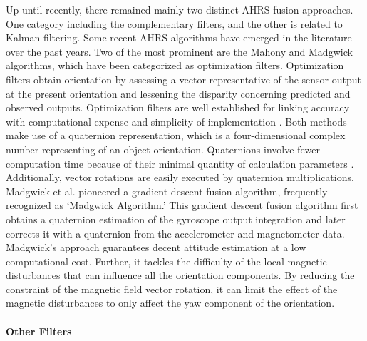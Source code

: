 Up until recently, there remained mainly two distinct AHRS fusion approaches. One category including the complementary filters, and the other is related to Kalman filtering. Some recent AHRS algorithms have emerged in the literature over the past years. Two of the most prominent are the Mahony and Madgwick algorithms, which have been categorized as optimization filters. Optimization filters obtain orientation by assessing a vector representative of the sensor output at the present orientation and lessening the disparity concerning predicted and observed outputs. Optimization filters are well established for linking accuracy with computational expense and simplicity of implementation \cite{madgwick2020extended}.
Both methods make use of a quaternion representation, which is a four-dimensional complex number representing of an object orientation. Quaternions involve fewer computation time because of their minimal quantity of calculation parameters \cite{ludwig2018comparison}. Additionally, vector rotations are easily executed by quaternion multiplications.
Madgwick et al. \cite{madgwick2010efficient} pioneered a gradient descent fusion algorithm, frequently recognized as ‘Madgwick Algorithm.’ This gradient descent fusion algorithm first obtains a quaternion estimation of the gyroscope output integration and later corrects it with a quaternion from the accelerometer and magnetometer data. Madgwick’s approach guarantees decent attitude estimation at a low computational cost. Further, it tackles the difficulty of the local magnetic disturbances that can influence all the orientation components. By reducing the constraint of the magnetic field vector rotation, it can limit the effect of the magnetic disturbances to only affect the yaw component of the orientation.

\paragraph{Other Filters}
